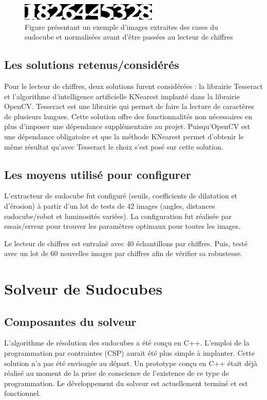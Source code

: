 \begin{figure}[htbp]
\centering
\includegraphics[scale=0.9]{fig/chiffresLues.png}
\caption{Figure présentant un exemple d'images extraites des cases du sudocube et normalisées avant d'être passées au lecteur de chiffres}
\label{fig:chifLu}
\end{figure}

\subsection{Les solutions retenus/considérés}
Pour le lecteur de chiffres, deux solutions furent considérées : la librairie Tesseract et l'algorithme d'intelligence artificielle KNearest implanté dans la librairie OpenCV. Tesseract est une librairie qui permet de faire la lecture de caractères de plusieurs langues. Cette solution offre des fonctionnalités non nécessaires en plus d'imposer une dépendance supplémentaire au projet. Puisqu’OpenCV est une dépendance obligatoire et que la méthode KNearest permet d'obtenir le même résultat qu'avec Tesseract le choix s'est posé sur cette solution.

\subsection{Les moyens utilisé pour configurer}
L'extracteur de sudocube fut configuré (seuils, coefficients de dilatation et d'érosion) à partir d'un lot de tests de 42 images (angles, distances sudocube/robot et luminosités variées). La configuration fut réalisée par essais/erreur pour trouver les paramètres optimaux pour toutes les images.

Le lecteur de chiffres est entraîné avec 40 échantillons par chiffres. Puis, testé avec un lot de 60 nouvelles images par chiffres afin de vérifier sa robustesse.

\section{Solveur de Sudocubes}

\subsection{Composantes du solveur}
L'algorithme de résolution des sudocubes a été conçu en C++. L'emploi de la programmation par contraintes (CSP) aurait été  plus simple à implanter. Cette solution n'a pas été envisagée au départ. Un prototype conçu en C++ était déjà réalisé au moment de la prise de conscience de l'existence de ce type de programmation. Le développement du solveur est actuellement terminé et est fonctionnel.


